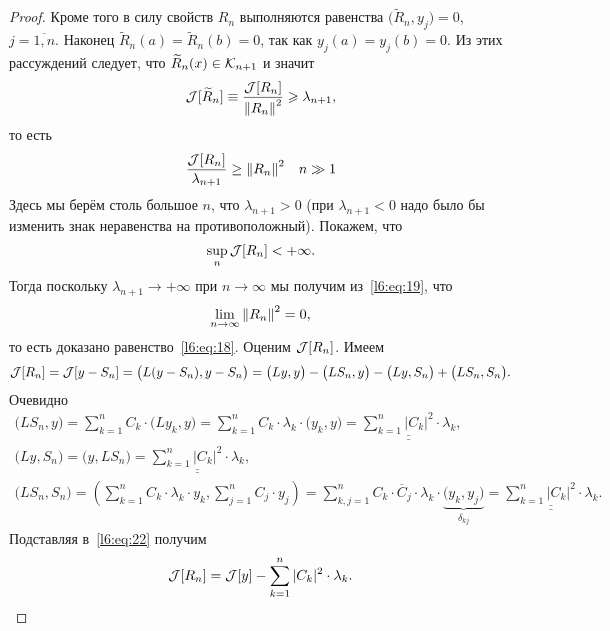 \begin{proof}
	Кроме того в силу свойств $R_n$ выполняются равенства $\big(\widetilde{R}_n,y_j\big)=0$, $j=\overline{1,n}$. Наконец $\widetilde{R}_n(a)=\widetilde{R}_n(b)=0$, так как $y_j(a)=y_j(b)=0$. Из этих рассуждений следует, что $\widetilde{R}_n(x)\in\mathcal{K}_{n+1}$ и значит 
	\begin{equation*}
		\hfill\J[\widetilde{R}_n]\equiv\frac{\J[R_n]}{{\norm{R_n}}^2}\geqslant\lambda_{n+1},\hfill
	\end{equation*} 
	то есть
	\begin{equation}
		\label{l6:eq:19}
		\hfill\frac{\J[R_n]}{\lambda_{n+1}}\geq{\norm{R_n}}^2\quad n\gg1\hfill
	\end{equation}
	Здесь мы берём столь большое $n$, что $\lambda_{n+1}>0$ (при $\lambda_{n+1}<0$ надо было бы изменить знак неравенства на противоположный). Покажем, что
	\begin{equation}
		\label{l6:eq:20}
		\hfill\sup\limits_{n}\J[R_n]<+\infty.\hfill
	\end{equation}
	Тогда поскольку $\lambda_{n+1}\to+\infty$ при $n\to\infty$ мы получим из~\eqref{l6:eq:19}, что 
	\begin{equation}
		\label{l6:eq:21}
		\hfill\lim\limits_{n\to\infty}{\norm{R_n}}^2=0,\hfill
	\end{equation}
	то есть доказано равенство~\eqref{l6:eq:18}. Оценим $\mathcal{J}[R_n]$. Имеем 
	\begin{equation}
		\label{l6:eq:22}
		\mathcal{J}[R_n]=\mathcal{J}[y-S_n]=\big(L(y-S_n),y-S_n\big)=\big(Ly,y\big)-\big(LS_n,y\big)-\big(Ly,S_n\big)+\big(LS_n,S_n\big).
	\end{equation}
	Очевидно
	\begin{gather*}
		\big(LS_n,y\big)=\sum\limits_{k=1}^n C_k\cdot\big(Ly_k,y\big)=\sum\limits_{k=1}^n C_k\cdot\lambda_k\cdot\big(y_k,y\big)=\underline{\underline{\sum\limits_{k=1}^n |C_k|^2\cdot\lambda_k}},\\			\big(Ly,S_n\big)=\big(y,LS_n\big)=\underline{\underline{\sum\limits_{k=1}^n |C_k|^2\cdot\lambda_k}},\\
		\big(LS_n,S_n\big)=\left(\sum\limits_{k=1}^n C_k\cdot\lambda_k\cdot y_k,\sum\limits_{j=1}^n C_j\cdot y_j\right)=\sum\limits_{k,j=1}^n C_k\cdot \overline{C}_j\cdot\lambda_k\cdot\underbrace{\big(y_k,y_j\big)}_{\delta_{kj}}=\underline{\underline{\sum\limits_{k=1}^n |C_k|^2\cdot\lambda_k}}.
	\end{gather*}
	Подставляя в~\eqref{l6:eq:22} получим 
	\begin{equation*}
		\hfill\J[R_n]=\J[y]-\sum\limits_{k=1}^n|C_k|^2\cdot\lambda_k.\hfill
	\end{equation*}
	

\end{proof}
